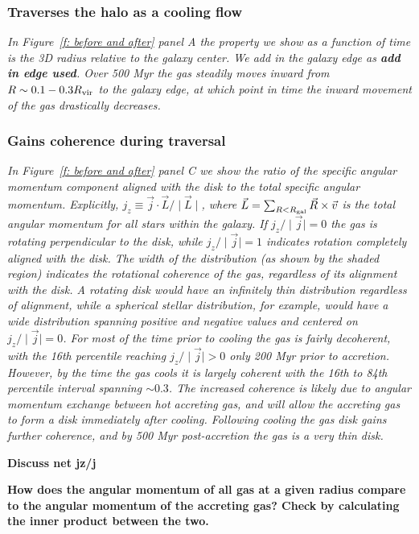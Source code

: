 \documentclass[fleqn,usenatbib]{mnras}
\begin{document}
\subsubsection{Traverses the halo as a cooling flow}

\textit{
In Figure~\ref{f: before and after} panel A the property we show as a function of time is the 3D radius relative to the galaxy center.
We add in the galaxy edge as \textbf{add in edge used}.
Over 500 Myr the gas steadily moves inward from $ R\sim 0.1 - 0.3 R_{\rm vir}$ to the galaxy edge, at which point in time the inward movement of the gas drastically decreases.
}

\subsubsection{Gains coherence during traversal}

\textit{
In Figure~\ref{f: before and after} panel C we show the ratio of the specific angular momentum component aligned with the disk to the total specific angular momentum.
Explicitly, $j_z \equiv \vec j \cdot \vec L / \mid \vec L \mid $, where $\vec L = \sum_{R < R_{\rm gal}} \vec R \times \vec v$ is the total angular momentum for all stars within the galaxy.
If $j_z/\mid \vec j \mid=0$ the gas is rotating perpendicular to the disk, while $j_z/\mid \vec j \mid=1$  indicates rotation completely aligned with the disk.
The width of the distribution (as shown by the shaded region) indicates the rotational coherence of the gas, regardless of its alignment with the disk.
A rotating disk would have an infinitely thin distribution regardless of alignment, while a spherical stellar distribution, for example, would have a wide distribution spanning positive and negative values and centered on  $j_z/\mid \vec j \mid=0$.
For most of the time prior to cooling the gas is fairly decoherent, with the 16th percentile reaching  $j_z/\mid \vec j \mid > 0$  only 200 Myr prior to accretion.
However, by the time the gas cools it is largely coherent with the 16th to 84th percentile interval spanning $\sim 0.3$.
The increased coherence is likely due to angular momentum exchange between hot accreting gas, and will allow the accreting gas to form a disk immediately after cooling.
Following cooling the gas disk gains further coherence, and by 500 Myr post-accretion the gas is a very thin disk.
}

\textbf{
Discuss net jz/j
}

\textbf{
How does the angular momentum of all gas at a given radius compare to the angular momentum of the accreting gas?
Check by calculating the inner product between the two.
}
\end{document}
